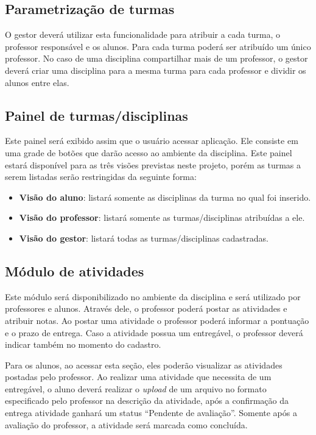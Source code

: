 \subsection{Parametrização de turmas}
O gestor deverá utilizar esta funcionalidade para atribuir a cada turma, o professor responsável e os alunos. Para cada turma poderá ser atribuído um único professor. No caso de uma disciplina compartilhar mais de um professor, o gestor deverá criar uma disciplina para a mesma turma para cada professor e dividir os alunos entre elas. 

\subsection{Painel de turmas/disciplinas}
Este painel será exibido assim que o usuário acessar aplicação. Ele consiste em uma grade de botões que darão acesso ao ambiente da disciplina. Este painel estará disponível para as três visões previstas neste projeto, porém as turmas a serem listadas serão restringidas da seguinte forma:

\begin{itemize}
\item \textbf{Visão do aluno}: listará somente as disciplinas da turma no qual foi inserido.
\item \textbf{Visão do professor}: listará somente as turmas/disciplinas atribuídas a ele.
\item \textbf{Visão do gestor}: listará todas as turmas/disciplinas cadastradas.
\end{itemize}


\subsection{Módulo de atividades}
Este módulo será disponibilizado no ambiente da disciplina e será utilizado por professores e alunos. Através dele, o professor poderá postar as atividades e atribuir notas. Ao postar uma atividade o professor poderá informar a pontuação e o prazo de entrega. Caso a atividade possua um entregável, o professor deverá indicar também no momento do cadastro.


Para os alunos, ao acessar esta seção, eles poderão visualizar as atividades postadas pelo professor. Ao realizar uma atividade que necessita de um entregável, o aluno deverá realizar o \textit{upload} de um arquivo no formato especificado pelo professor na descrição da atividade, após a confirmação da entrega atividade ganhará um status “Pendente de avaliação”. Somente após a avaliação do professor, a atividade será marcada como concluída.


